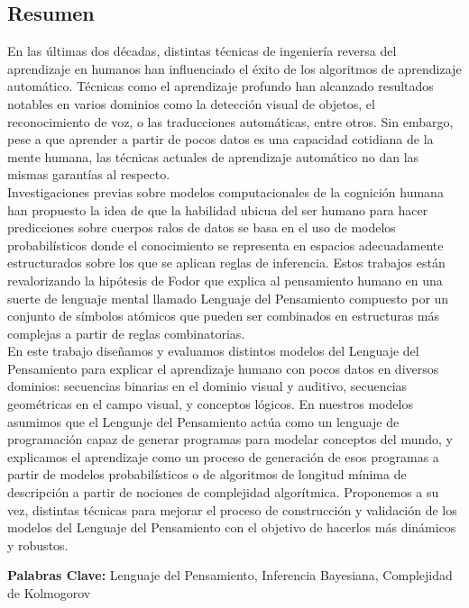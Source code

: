 \rhead{}
\lhead{}
\renewcommand{\headrulewidth}{0pt}
\begin{center}
    \section*{Resumen}
\end{center}

En las últimas dos décadas, distintas técnicas de ingeniería reversa del aprendizaje en humanos han influenciado el éxito de los algoritmos de aprendizaje automático. Técnicas como el aprendizaje profundo han alcanzado resultados notables en varios dominios como la detección visual de objetos, el reconocimiento de voz, o las traducciones automáticas, entre otros. Sin embargo, pese a que aprender a partir de pocos datos es una capacidad cotidiana de la mente humana, las técnicas actuales de aprendizaje automático no dan las mismas garantías al respecto.\\

\medskip
Investigaciones previas sobre modelos computacionales de la cognición humana han propuesto la idea de que la habilidad ubicua del ser humano para hacer predicciones sobre cuerpos ralos de datos se basa en el uso de modelos probabilísticos donde el conocimiento se representa en espacios adecuadamente estructurados sobre los que se aplican reglas de inferencia. Estos trabajos están revalorizando la hipótesis de Fodor que explica al pensamiento humano en una suerte de lenguaje mental llamado Lenguaje del Pensamiento compuesto por un conjunto de símbolos atómicos que pueden ser combinados en estructuras más complejas a partir de reglas combinatorias.\\

\medskip
En este trabajo diseñamos y evaluamos distintos modelos del Lenguaje del Pensamiento para explicar el aprendizaje humano con pocos datos en diversos dominios: secuencias binarias en el dominio visual y auditivo, secuencias geométricas en el campo visual, y conceptos lógicos. En nuestros modelos asumimos que el Lenguaje del Pensamiento actúa como un lenguaje de programación capaz de generar programas para modelar conceptos del mundo, y explicamos el aprendizaje como un proceso de generación de esos programas a partir de modelos probabilísticos o de algoritmos de longitud mínima de descripción a partir de nociones de complejidad algorítmica. Proponemos a su vez, distintas técnicas para mejorar el proceso de construcción y validación de los modelos del Lenguaje del Pensamiento con el objetivo de hacerlos más dinámicos y robustos.
\vfill


\noindent\textbf{Palabras Clave:} Lenguaje del Pensamiento, Inferencia Bayesiana, Complejidad de Kolmogorov